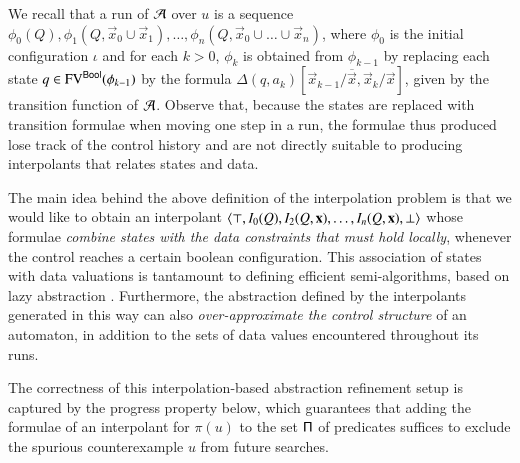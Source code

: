 \documentclass[10pt,conference,letterpaper,twocolumn]{IEEEtran}
\begin{document}
We recall that a run of $\mathcal{A}$ over $u$ is a sequence $\phi_0(Q),
\phi_1(Q,\vec{x}_0\cup\vec{x}_1), \ldots,
\phi_n(Q,\vec{x}_0\cup\ldots\cup\vec{x}_n)$, where $\phi_0$ is the
initial configuration $\iota$ and for each $k>0$, $\phi_k$ is obtained
from $\phi_{k-1}$ by replacing each state $q \in
\mathrm{FV}^{\mathsf{Bool}}(\phi_{k-1})$ by the formula
$\Delta(q,a_k)[\vec{x}_{k-1}/\overline{\vec{x}},\vec{x}_k/\vec{x}]$,
given by the transition function of $\mathcal{A}$. Observe that, because the
states are replaced with transition formulae when moving one step in a
run, the formulae thus produced lose track of the control history and
are not directly suitable to producing interpolants that relates
states and data.

The main idea behind the above definition of the interpolation problem
is that we would like to obtain an interpolant $\left\langle \top,I_0(Q),
  I_2(Q,\mathbf x), \ldots, I_{n}(Q,\mathbf x),\bot \right\rangle$ whose formulae
\emph{combine states with the data constraints that must hold
  locally}, whenever the control reaches a certain boolean
configuration. This association of states with data valuations is
tantamount to defining efficient semi-algorithms, based on lazy
abstraction \cite{HJMS02}. Furthermore, the abstraction defined by the
interpolants generated in this way can also \emph{over-approximate the
  control structure} of an automaton, in addition to the sets of data
values encountered throughout its runs.

The correctness of this interpolation-based abstraction refinement
setup is captured by the progress property below, which guarantees
that adding the formulae of an interpolant for $\pi(u)$ to the set
$\mathsf{\Pi}$ of predicates suffices to exclude the spurious counterexample
$u$ from future searches.
\end{document}
